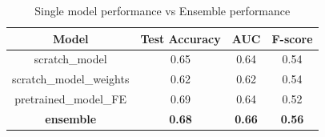 \documentclass[11pt,a4paper,oneside]{article}
\begin{document}
\begin{table}[h]
\centering
	\begin{tabular}{|c|ccc|}
	\hline
	Model & Test Accuracy & AUC & F-score \\
	\hline
	scratch\_model 			& 0.65 & 0.64 & 0.54 \\
	scratch\_model\_weights & 0.62 & 0.62 & 0.54 \\
	pretrained\_model\_FE   & 0.69 & 0.64 & 0.52 \\
	\textbf{ensemble} 		& \textbf{0.68} & \textbf{0.66} & \textbf{0.56} \\
	\hline
	\end{tabular}
\caption{Single model performance vs Ensemble performance}
\end{table}
\end{document}
